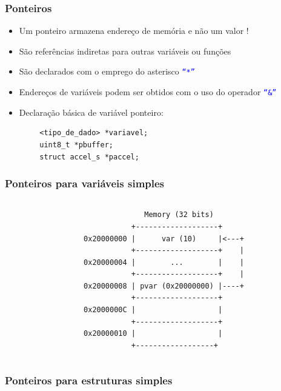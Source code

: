 \documentclass{beamer}
\begin{document}
\begin{frame}[fragile]
	\frametitle{Ponteiros}
	\begin{itemize}
		\item Um ponteiro armazena endereço de memória e não um valor !
		\item São referências indiretas para outras variáveis ou funções
		\item São declarados com o emprego do asterisco \texttt{\textcolor{blue}{``*''}}
		\item Endereços de variáveis podem ser obtidos com o uso do operador \texttt{\textcolor{blue}{``\&''}}
		\item Declaração básica de variável ponteiro:
	\end{itemize}
	\begin{verbatim}
        <tipo_de_dado> *variavel;
        uint8_t *pbuffer;
        struct accel_s *paccel;
	\end{verbatim}
\end{frame}

\begin{frame}[fragile]
	\frametitle{Ponteiros para variáveis simples}
	\begin{columns}[T] %
	\begin{column}{.50\textwidth}
		
	\end{column}%
	\hfill%
	\begin{column}{.50\textwidth}
	 {\tiny
	\begin{verbatim}
              Memory (32 bits)
           +-------------------+
0x20000000 |      var (10)     |<---+
           +-------------------+    |
0x20000004 |        ...        |    |
           +-------------------+    |
0x20000008 | pvar (0x20000000) |----+
           +-------------------+
0x2000000C |                   |
           +-------------------+
0x20000010 |                   |
           +------------------+
	\end{verbatim}
}
	\end{column}%
\end{columns}
\end{frame}

\begin{frame}[fragile]
	\frametitle{Ponteiros para estruturas simples}
	\begin{columns}[T] %
	\begin{column}{.75\textwidth}
		
	\end{column}%
	\hfill%
	\begin{column}{.25\textwidth}
	\end{column}%
\end{columns}
\end{frame}
\end{document}
